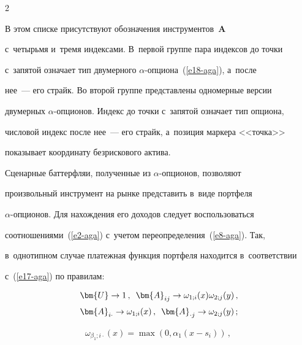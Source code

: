 \begin{multicols}{2}


  В этом списке присутствуют обозначения инструментов~$\bm{A}$ 


с~четырьмя и~тремя индексами. В~первой группе пара индексов до точки 


с~запятой означает тип двумерного $\alpha$-оп\-ци\-она~(\ref{e18-aga}), а~после 


нее~--- его страйк. Во второй группе представлены одномерные версии 


двумерных $\alpha$-оп\-ци\-онов. Индекс до точки с~запятой означает тип опциона, 


числовой индекс после нее~--- его страйк, а~позиция маркера <<точка>> 


показывает координату безрискового актива. 


  


  Сценарные баттерфляи, полученные из $\alpha$-оп\-ци\-онов, позволяют 


произвольный инструмент на рынке представить в~виде портфеля  


$\alpha$-оп\-ци\-онов. Для нахождения его доходов следует воспользоваться 


соотношениями~(\ref{e2-aga}) с~учетом переопределения~(\ref{e8-aga}). Так, 


в~однотипном случае платежная функция портфеля находится в~соответствии 


с~(\ref{e17-aga}) по правилам: 


  \begin{multline}


  \bm{U}\to 1\,,\enskip \bm{A}_{ij}\to \omega_{1;i}(x)\omega_{2;j}(y)\,,\\[2pt] 


\bm{A}_{i\cdot}\to \omega_{1;i}(x)\,,\enskip 


 \bm{A}_{\cdot j}\to \omega_{2;j}(y)\,;


  \label{e19-aga}


  \end{multline}


  


  \vspace*{-12pt}


  


  \noindent


  \begin{multline*}


  \omega_{\beta_1;i\cdot}(x)=\max \left( 0,\alpha_1(x-s_i)\right)\,,\



\end{multline*}
\end{multicols}
